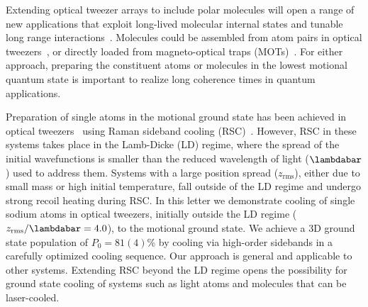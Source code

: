 \documentclass[aps,prl,twocolumn,groupedaddress]{revtex4-1}
\begin{document}
Extending optical tweezer arrays to include polar molecules will open a range of
new applications that exploit long-lived molecular internal states
and tunable long range interactions~\cite{DeMille2002,Gorshkov2011,Yan2013}.
Molecules could be assembled from atom pairs in optical tweezers~\cite{Liu2017},
or directly loaded from magneto-optical traps
(MOTs)~\cite{Barry2014,Truppe2017SubDoppler,Anderegg2017}.
For either approach, preparing the constituent atoms or molecules in the lowest motional
quantum state is important to realize long coherence times in quantum applications.

Preparation of single atoms in the motional ground state has been achieved in optical tweezers~\cite{Kaufman2012,Thompson2013,Liu2017,Robens2017}
 using Raman sideband cooling (RSC)~\cite{Monroe1995,Kerman2000,Han2000}.
However, RSC in these systems takes place in the Lamb-Dicke (LD) regime, where
the spread of the initial wavefunctions is smaller than the reduced wavelength of light ($\lambdabar$)
used to address them.
Systems with a large position spread ($z_{\textrm{rms}}$), either due to small mass or high initial temperature,
fall outside of the LD regime and undergo strong recoil heating during RSC.
In this letter we demonstrate cooling of single sodium atoms in optical tweezers,
initially outside the LD regime ($z_{\textrm{rms}}/\lambdabar=4.0$), to the motional ground state.
We achieve a 3D ground state population of $P_0=81(4)$\% by cooling via
 high-order sidebands in a carefully optimized cooling sequence.
Our approach is general and applicable to
other systems. Extending RSC beyond the LD regime opens the possibility
for ground state cooling of systems such as light atoms and
molecules that can be laser-cooled.
\end{document}
